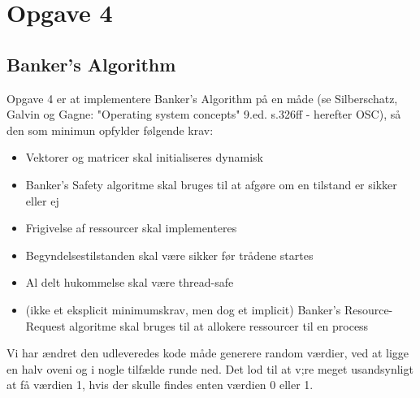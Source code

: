 \section{Opgave 4}
\subsection{Banker's Algorithm}
Opgave 4 er at implementere Banker's Algorithm på en måde (se Silberschatz, Galvin og Gagne: "Operating system concepts" 9.ed. s.326ff - herefter OSC), så den som minimun opfylder følgende krav:
\begin{itemize}
	\item Vektorer og matricer skal initialiseres dynamisk
	\item Banker's Safety algoritme skal bruges til at afgøre om en tilstand er sikker eller ej
	\item Frigivelse af ressourcer skal implementeres
	\item Begyndelsestilstanden skal være sikker før trådene startes
	\item Al delt hukommelse skal være thread-safe
	\item (ikke et eksplicit minimumskrav, men dog et implicit) Banker's Resource-Request algoritme skal bruges til at allokere ressourcer til en process
\end{itemize}

Vi har ændret den udleveredes kode måde generere random værdier, ved at ligge en halv oveni og i nogle tilfælde runde ned. Det lod til at v;re meget usandsynligt at få værdien 1, hvis der skulle findes enten værdien 0 eller 1.

